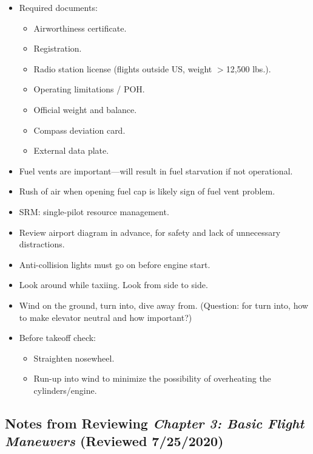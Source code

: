 \documentclass[letterpaper,10pt,titlepage]{article}
\begin{document}
\begin{itemize}
\item Required documents:
	  \begin{itemize}
	  \item Airworthiness certificate.
	  \item Registration.
	  \item Radio station license (flights outside US, weight $>$12,500 lbs.).
	  \item Operating limitations / POH.
	  \item Official weight and balance.
	  \item Compass deviation card.
	  \item External data plate.
	  \end{itemize}
\item Fuel vents are important---will result in fuel starvation if not operational.
\item Rush of air when opening fuel cap is likely sign of fuel vent problem.
\item SRM:  single-pilot resource management.
\item Review airport diagram in advance, for safety and lack of unnecessary distractions.
\item Anti-collision lights must go on before engine start.
\item Look around while taxiing.  Look from side to side.
\item Wind on the ground, turn into, dive away from.  (Question:  for turn into,
      how to make elevator neutral and how important?)
\item Before takeoff check:
	  \begin{itemize}
	  \item Straighten nosewheel.
	  \item Run-up into wind to minimize the possibility of overheating the
	        cylinders/engine.
	  \end{itemize}
\end{itemize}


\subsection{Notes from Reviewing \emph{Chapter 3:  Basic Flight Maneuvers}
            (Reviewed 7/25/2020)}
\label{snra0:sbfm0}
\end{document}
